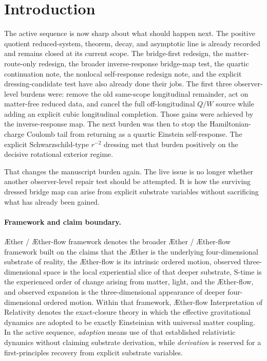 \documentclass[11pt]{article}
\newcommand{\Aether}{\AE{}ther}
\newcommand{\Aflow}{\AE{}ther-flow}
\newcommand{\TheoryName}{\Aflow{} Interpretation of Relativity}
\newcommand{\TheoryProgram}{\Aether{} / \Aflow{} framework}
\begin{document}
\section{Introduction}

The active sequence is now sharp about what should happen next. The positive quotient reduced-system, theorem, decay, and asymptotic line is already recorded and remains closed at its current scope. The bridge-first redesign, the matter-route-only redesign, the broader inverse-response bridge-map test, the quartic continuation note, the nonlocal self-response redesign note, and the explicit dressing-candidate test have also already done their jobs. The first three observer-level burdens were: remove the old same-scope longitudinal remainder, act on matter-free reduced data, and cancel the full off-longitudinal \(Q/W\) source while adding an explicit cubic longitudinal completion. Those gains were achieved by the inverse-response map. The next burden was then to stop the Hamiltonian-charge Coulomb tail from returning as a quartic Einstein self-response. The explicit Schwarzschild-type \(r^{-2}\) dressing met that burden positively on the decisive rotational exterior regime.

That changes the manuscript burden again. The live issue is no longer whether another observer-level repair test should be attempted. It is how the surviving dressed bridge map can arise from explicit substrate variables without sacrificing what has already been gained.

\paragraph{Framework and claim boundary.}
\TheoryProgram{} denotes the broader \Aether{} / \Aflow{} framework built on the claims that the \Aether{} is the underlying four-dimensional substrate of reality, the \Aflow{} is its intrinsic ordered motion, observed three-dimensional space is the local experiential slice of that deeper substrate, S-time is the experienced order of change arising from matter, light, and the \Aflow{}, and observed expansion is the three-dimensional appearance of deeper four-dimensional ordered motion. Within that framework, \TheoryName{} denotes the exact-closure theory in which the effective gravitational dynamics are adopted to be exactly Einsteinian with universal matter coupling. In the active sequence, \emph{adoption} means use of that established relativistic dynamics without claiming substrate derivation, while \emph{derivation} is reserved for a first-principles recovery from explicit substrate variables.
\end{document}
